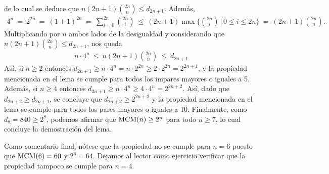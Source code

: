 de lo cual se deduce que $n(2n+1){2n\choose n} \leq d_{2n+1}$.
		Además, 
		\begin{eqnarray*}
		4^n \ = \ 2^{2n} \ = \ (1+1)^{2n} \ = \ \sum_{i=0}^{2n}{2n\choose i} \ \leq \ (2n+1)\max\bigg\{{2n\choose i} \,\bigg|\, 0\leq i\leq 2n\bigg\}\ =\ (2n+1){2n\choose n}.
		\end{eqnarray*}
		Multiplicando por $n$ ambos lados de la desigualdad y considerando que $n(2n+1){2n\choose n} \leq d_{2n+1}$, nos queda
		\begin{eqnarray*}
			n\cdot 4^n \ \leq \ n(2n+1){2n\choose n} \ \leq \ d_{2n+1}
		\end{eqnarray*}
		Así, si $n\geq 2$ entonces $d_{2n+1}\geq n\cdot 4^{n} = n\cdot 2^{2n}\geq 2\cdot 2^{2n}=2^{2n+1}$, y la propiedad mencionada en el lema se cumple para todos los impares mayores o iguales a 5. Además, si $n\geq 4$ entonces $d_{2n+1}\geq n\cdot 4^{n}\geq 4\cdot 4^{n}=2^{2n+2}$. Así, dado que $d_{2n+2}\geq d_{2n+1}$, se concluye que $d_{2n+2}\geq 2^{2n+2}$ y la propiedad mencionada en el lema se cumple para todos los pares mayores o iguales a 10.
Finalmente, como $d_8=840 \geq 2^8$, podemos afirmar que ${\rm MCM}(n) \geq 2^n$ para todo $n \geq 7$, lo cual concluye la demostración del lema. 

Como comentario final, nótese que la propiedad no se cumple para $n = 6$ puesto que ${\rm MCM}(6) = 60$ y $2^6 = 64$. Dejamos al lector como ejercicio verificar que la propiedad tampoco se cumple para $n=4$.
		
		
